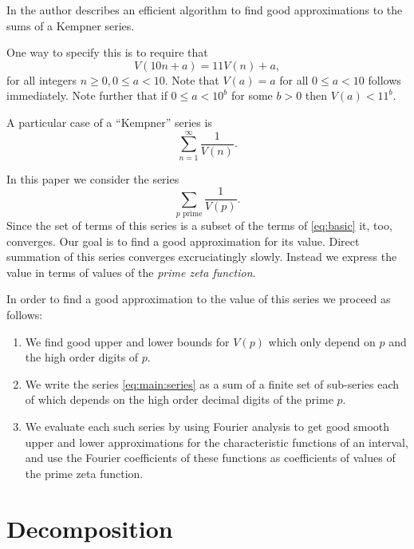 \documentclass{article}
\begin{document}
In \cite{baillie1979sums} the author describes an efficient
algorithm to find good approximations to the sums of a Kempner series.

One way to specify this is to require that
\begin{equation}
  \label{eq:basic}
  V(10 n + a) = 11 V(n) + a,
\end{equation}
for all integers $n \ge 0, 0 \le a < 10$. Note that $V(a) = a$ for all
$0 \le a < 10$ follows immediately. Note further that if $0 \le a <
10^b$ for some $b > 0$ then $V(a) < 11^b$.


A particular case of a ``Kempner'' series is
\begin{displaymath}
  \sum_{n=1}^\infty \frac{1}{V(n)}.
\end{displaymath}
 
In this paper we consider the series
\begin{equation}
  \label{eq:main:series}
  \sum_{p \text{ prime}} \frac{1}{V(p)}.
\end{equation}
Since the set of terms of this series is a subset of the terms of
\eqref{eq:basic} it, too, converges. Our goal is to find a good
approximation for its value. Direct summation of this series converges
excruciatingly slowly. Instead we express the value in terms of values
of the \emph{prime zeta function}.

In order to find a good approximation to the value of this series we
proceed as follows:

\begin{enumerate}
\item We find good upper and lower bounds for $V(p)$ which only depend
  on $p$ and the high order digits of $p$.
\item We write the series \eqref{eq:main:series} as a sum of a finite
  set of sub-series
  each of which depends on the high order decimal digits of the prime
  $p$.
\item We evaluate each such series by using Fourier analysis to get
  good smooth upper and lower approximations for the characteristic
  functions of an interval, and use the Fourier coefficients of these
  functions as coefficients of values of the prime zeta function.
\end{enumerate}
\section{Decomposition}
\label{sec:decomp}
\end{document}
